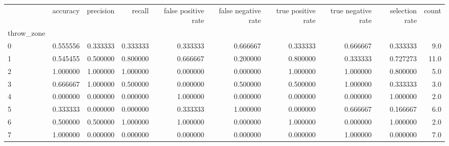 \begin{tabular}{lrrrrrrrrr}
\toprule
{} &  accuracy &  precision &    recall &  false positive rate &  false negative rate &  true positive rate &  true negative rate &  selection rate &  count \\
throw\_zone &           &            &           &                      &                      &                     &                     &                 &        \\
\midrule
0          &  0.555556 &   0.333333 &  0.333333 &             0.333333 &             0.666667 &            0.333333 &            0.666667 &        0.333333 &    9.0 \\
1          &  0.545455 &   0.500000 &  0.800000 &             0.666667 &             0.200000 &            0.800000 &            0.333333 &        0.727273 &   11.0 \\
2          &  1.000000 &   1.000000 &  1.000000 &             0.000000 &             0.000000 &            1.000000 &            1.000000 &        0.800000 &    5.0 \\
3          &  0.666667 &   1.000000 &  0.500000 &             0.000000 &             0.500000 &            0.500000 &            1.000000 &        0.333333 &    3.0 \\
4          &  0.000000 &   0.000000 &  0.000000 &             1.000000 &             0.000000 &            0.000000 &            0.000000 &        1.000000 &    2.0 \\
5          &  0.333333 &   0.000000 &  0.000000 &             0.333333 &             1.000000 &            0.000000 &            0.666667 &        0.166667 &    6.0 \\
6          &  0.500000 &   0.500000 &  1.000000 &             1.000000 &             0.000000 &            1.000000 &            0.000000 &        1.000000 &    2.0 \\
7          &  1.000000 &   0.000000 &  0.000000 &             0.000000 &             0.000000 &            0.000000 &            1.000000 &        0.000000 &    7.0 \\
\bottomrule
\end{tabular}

